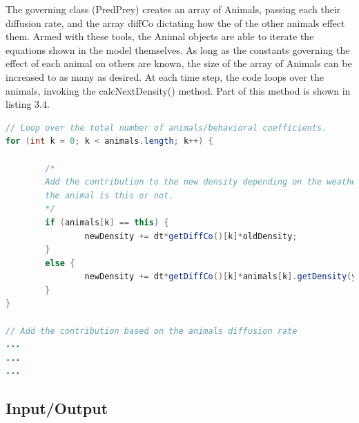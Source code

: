 \documentclass[11pt]{report}
\begin{document}
The governing class (PredPrey) creates an array of Animals, passing each their diffusion rate, and the array diffCo dictating how the of the other animals effect them. Armed with these tools, the Animal objects are able to iterate the equations shown in the model themselves. As long as the constants governing the effect of each animal on others are known, the size of the array of Animals can be increased to as many as desired. At each time step, the code loops over the animals, invoking the calcNextDensity() method. Part of this method is shown in listing 3.4.

\begin{lstlisting}[language=Java,caption=The key part of the computational kernel within animal - called when the density for a single cell is to be updated to the next time step.]
// Loop over the total number of animals/behavioral coefficients.
for (int k = 0; k < animals.length; k++) {
			
		/*
		Add the contribution to the new density depending on the weather 
		the animal is this or not.
		*/
		if (animals[k] == this) {
				newDensity += dt*getDiffCo()[k]*oldDensity;
		} 
		else {
				newDensity += dt*getDiffCo()[k]*animals[k].getDensity(y, x)*oldDensity;
		}
}

// Add the contribution based on the animals diffusion rate
...
...
...
\end{lstlisting} 

\subsection{Input/Output} %
      
          
       
      
\end{document}

